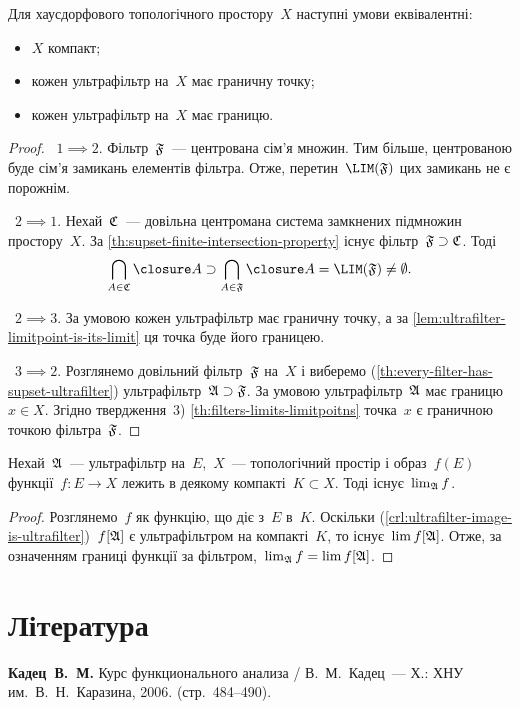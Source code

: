 \begin{theorem}
    Для хаусдорфового топологічного простору~$X$ наступні умови еквівалентні:
    \begin{itemize}
        \item $X$ компакт;
        \item кожен ультрафільтр на~$X$ має граничну точку;
        \item кожен ультрафільтр на~$X$ має границю.
    \end{itemize}
\end{theorem}
\begin{proof}
   ~$1 \implies 2$. Фільтр~$\frak F$~--- центрована сім'я множин. Тим більше, центрованою буде сім'я замикань елементів фільтра. Отже, перетин~$\LIM(\frak F)$ цих замикань не є порожнім. 
    
   ~$2 \implies 1$. Нехай~$\frak C$~--- довільна центромана система замкнених підмножин простору~$X$. За \cref{th:supset-finite-intersection-property} існує фільтр~$\frak F \supset \frak C$. Тоді
    \begin{equation*}
        \bigcap_{A \in \frak C} \closure A \supset \bigcap_{A \in \frak F} \closure A = \LIM(\frak F) \ne \emptyset.
    \end{equation*}
    
   ~$2 \implies 3$. За умовою кожен ультрафільтр має граничну точку, а за \cref{lem:ultrafilter-limitpoint-is-its-limit} ця точка буде його границею. 
    
   ~$3 \implies 2$. Розглянемо довільний фільтр~$\frak F$ на~$X$ і виберемо (\cref{th:every-filter-has-supset-ultrafilter}) ультрафільтр~$\frak A \supset \frak F$. За умовою ультрафільтр~$\frak A$ має границю~$x \in X$. Згідно твердження~3) \cref{th:filters-limits-limitpoitns} точка~$x$ є граничною точкою фільтра~$\frak F$.
\end{proof}

\begin{corollary}
    Нехай~$\frak A$~--- ультрафільтр на~$E$,~$X$~--- топологічний простір і образ~$f(E)$ функції~$f: E \to X$ лежить в деякому компакті~$K \subset X$. Тоді існує~$\lim_{\frak A} f$.
\end{corollary}
\begin{proof}
    Розглянемо~$f$ як функцію, що діє з~$E$ в~$K$. Оскільки (\cref{crl:ultrafilter-image-is-ultrafilter})~$f[\frak A]$ є ультрафільтром на компакті~$K$, то існує~$\lim f[\frak A]$. Отже, за означенням границі функції за фільтром,~$\lim_{\frak A} f = \lim f[\frak A]$.
\end{proof}

\section{Література}

\begin{enumerate}[label={[\arabic*]}]
\item \textbf{Кадец~В.~М.}
Курс функционального анализа /
В.~М.~Кадец~---
Х.: ХНУ им.~В.~Н.~Каразина, 2006. (стр.~484--490).
\end{enumerate}
